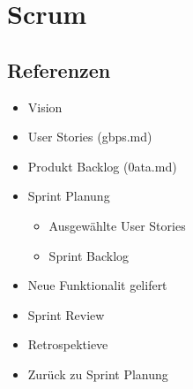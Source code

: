 \documentclass{sajzk}
\begin{document}
\section{Scrum} 
\label{dj7m}

\subsection{Referenzen} 
\begin{itemize}
    \item Vision
    \item User Stories (gbps.md)
    \item Produkt Backlog (0ata.md)
    \item Sprint Planung
    \begin{itemize}
        \item Ausgewählte User Stories
        \item Sprint Backlog
    \end{itemize}
    \item Neue Funktionalit gelifert
    \item Sprint Review
    \item Retrospektieve
    \item Zurück zu Sprint Planung
\end{itemize}

% 
\end{document}
